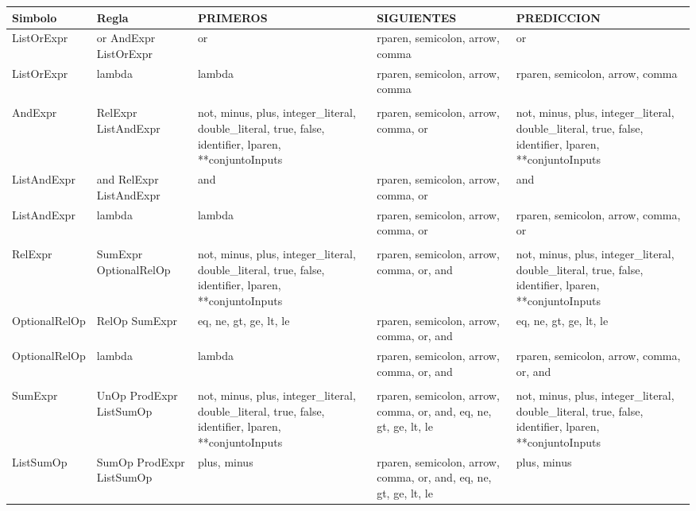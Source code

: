 \begin{tabularx}{\textwidth}{BBBBB}
          \toprule
          Simbolo & Regla & PRIMEROS & SIGUIENTES & PREDICCION \\
          \midrule
ListOrExpr & or AndExpr ListOrExpr & or    & rparen, semicolon, arrow, comma & or \\
               ListOrExpr & lambda & lambda & rparen, semicolon, arrow, comma & rparen, semicolon, arrow, comma \\
                     &       &       &       &  \\
               AndExpr & RelExpr ListAndExpr & not, minus, plus, integer\_literal, double\_literal, true, false, identifier, lparen, **conjuntoInputs & rparen, semicolon, arrow, comma, or & not, minus, plus, integer\_literal, double\_literal, true, false, identifier, lparen, **conjuntoInputs \\
               ListAndExpr & and RelExpr ListAndExpr & and   & rparen, semicolon, arrow, comma, or & and \\
               ListAndExpr & lambda & lambda & rparen, semicolon, arrow, comma, or & rparen, semicolon, arrow, comma, or \\
                     &       &       &       &  \\
               RelExpr & SumExpr OptionalRelOp & not, minus, plus, integer\_literal, double\_literal, true, false, identifier, lparen, **conjuntoInputs & rparen, semicolon, arrow, comma, or, and & not, minus, plus, integer\_literal, double\_literal, true, false, identifier, lparen, **conjuntoInputs \\
               OptionalRelOp & RelOp SumExpr & eq, ne, gt, ge, lt, le & rparen, semicolon, arrow, comma, or, and & eq, ne, gt, ge, lt, le \\
               OptionalRelOp & lambda & lambda & rparen, semicolon, arrow, comma, or, and & rparen, semicolon, arrow, comma, or, and \\

                     &       &       &       &  \\
               SumExpr & UnOp ProdExpr ListSumOp & not, minus, plus, integer\_literal, double\_literal, true, false, identifier, lparen, **conjuntoInputs & rparen, semicolon, arrow, comma, or, and, eq, ne, gt, ge, lt, le & not, minus, plus, integer\_literal, double\_literal, true, false, identifier, lparen, **conjuntoInputs \\
               ListSumOp & SumOp ProdExpr ListSumOp & plus, minus & rparen, semicolon, arrow, comma, or, and, eq, ne, gt, ge, lt, le & plus, minus \\



 \bottomrule
               \end{tabularx}%

